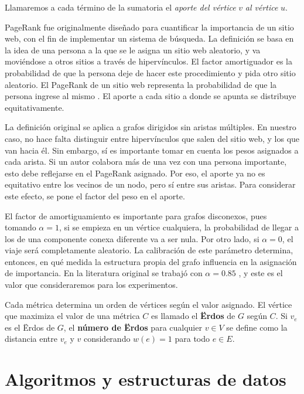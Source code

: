 \documentclass[journal]{IEEEtran}
\begin{document}
Llamaremos a cada término de la sumatoria el \textit{aporte del vértice} \(v\) \textit{al vértice} \(u\).

PageRank fue originalmente diseñado para cuantificar la importancia de un sitio web, con el fin de implementar un sistema de búsqueda. La definición se basa en la idea de una persona a la que se le asigna un sitio web aleatorio, y va moviéndose a otros sitios a través de hipervínculos. El factor amortiguador es la probabilidad de que la persona deje de hacer este procedimiento y pida otro sitio aleatorio. El PageRank de un sitio web representa la probabilidad de que la persona ingrese al mismo \cite{google}. El aporte a cada sitio a donde se apunta se distribuye equitativamente.

La definición original se aplica a grafos dirigidos sin aristas múltiples. En nuestro caso, no hace falta distinguir entre hipervínculos que salen del sitio web, y los que van hacia él. Sin embargo, sí es importante tomar en cuenta los pesos asignados a cada arista. Si un autor colabora más de una vez con una persona importante, esto debe reflejarse en el PageRank asignado. Por eso, el aporte ya no es equitativo entre los vecinos de un nodo, pero sí entre sus aristas. Para considerar este efecto, se pone el factor del peso en el aporte.

El factor de amortiguamiento es importante para grafos disconexos, pues tomando \(\alpha = 1\), si se empieza en un vértice cualquiera, la probabilidad de llegar a los de una componente conexa diferente va a ser nula. Por otro lado, si \(\alpha = 0\), el viaje será completamente aleatorio. La calibración de este parámetro determina, entonces, en qué medida la estructura propia del grafo influencia en la asignación de importancia. En la literatura original se trabajó con \(\alpha = 0.85\) \cite{google}, y este es el valor que consideraremos para los experimentos.

Cada métrica determina un orden de vértices según el valor asignado. El vértice que maximiza el valor de una métrica \(C\) es llamado el \textbf{Ërdos} de \(G\) según \(C\). Si \(v_e\) es el Ërdos de \(G\), el \textbf{número de Ërdos} para cualquier \(v \in V\) se define como la distancia entre \(v_e\) y \(v\) considerando \(w(e) = 1\) para todo \(e \in E\).

\section{Algoritmos y estructuras de datos}
\end{document}
